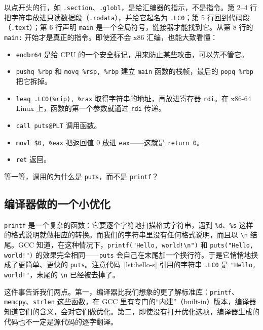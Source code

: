 
以点开头的行，如 \texttt{.section}、\texttt{.globl}，是给汇编器的指示，不是指令。第 2--4 行把字符串放进只读数据段（\texttt{.rodata}），并给它起名为 \texttt{.LC0}；第 5 行回到代码段（\texttt{.text}）；第 6 行声明 \texttt{main} 是一个全局符号，链接器才能找到它。从第 8 行的 \texttt{main:} 开始才是真正的指令。即使还不会 x86 汇编，也能大致看懂：
\begin{itemize}
  \item \texttt{endbr64} 是给 CPU 的一个安全标记，用来防止某些攻击，可以先不管它。
  \item \texttt{pushq \%rbp} 和 \texttt{movq \%rsp, \%rbp} 建立 \texttt{main} 函数的栈帧，最后的 \texttt{popq \%rbp} 把它拆掉。
  \item \texttt{leaq .LC0(\%rip), \%rax} 取得字符串的地址，再放进寄存器 \texttt{rdi}。在 x86-64 Linux 上，函数的第一个参数就通过 \texttt{rdi} 传递。
  \item \texttt{call puts@PLT} 调用函数。
  \item \texttt{movl \$0, \%eax} 把返回值 0 放进 \texttt{eax}——这就是 \texttt{return 0}。
  \item \texttt{ret} 返回。
\end{itemize}

等一等，调用的为什么是 \texttt{puts}，而不是 \texttt{printf}？

\subsection{编译器做的一个小优化}

\texttt{printf} 是一个复杂的函数：它要逐个字符地扫描格式字符串，遇到 \texttt{\%d}、\texttt{\%s} 这样的格式说明就做相应的转换。而我们的字符串里没有任何格式说明，而且以 \texttt{\textbackslash n} 结尾。GCC 知道，在这种情况下，\texttt{printf("Hello, world!\textbackslash n")} 和 \texttt{puts("Hello, world!")} 的效果完全相同——\texttt{puts} 会自己在末尾加一个换行符。于是它悄悄地换成了更简单、更快的 \texttt{puts}。注意代码~\ref{lst:hello-s} 引用的字符串 \texttt{.LC0} 是 \texttt{"Hello, world!"}，末尾的 \texttt{\textbackslash n} 已经被去掉了。

这件事告诉我们两点。第一，编译器比我们想象的更了解标准库：\texttt{printf}、\texttt{memcpy}、\texttt{strlen} 这些函数，在 GCC 里有专门的“内建”（built-in）版本，编译器知道它们的含义，会对它们做优化。第二，即使没有打开优化选项，编译器生成的代码也不一定是源代码的逐字翻译。

